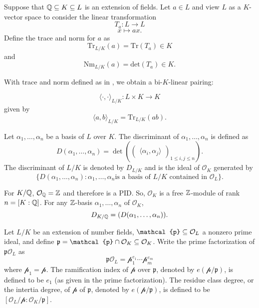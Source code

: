 
\begin{definition}
    Suppose that $\mathbb{Q} \subseteq K \subseteq L$ is an extension of fields. Let $a \in L$ and view $L$ as a $K$-vector space to consider the linear transformation
        \[T_a: L \to L\]
        \[x\mapsto ax. \]
    Define the trace and norm for $a$ as
        \[\textrm{Tr}_{L/K}(a) = \textrm{Tr}(T_a) \in K\]
    and
        \[\textrm{Nm}_{L/K}(a) = \textrm{det}(T_a) \in K.\]
\end{definition}

With trace and norm defined as in , we obtain a bi-$K$-linear pairing:

    \[\langle \cdot ,\cdot \rangle_{L/K}: L \times K \to K\]
given by
    \[\langle a, b\rangle_{L/K} = \textrm{Tr}_{L/K}(ab).\]
\begin{definition}
    Let $\alpha_1, \ldots, \alpha_n$ be a basis of $L$ over $K$. The discriminant of $\alpha_1, \ldots, \alpha_n$ is defined as
        \[D(\alpha_1, \ldots, \alpha_n) = \det\left(\begin{pmatrix}
            \langle \alpha_i, \alpha_j\rangle
        \end{pmatrix}_{1\leq i,j\leq n}\right).\]
    The discriminant of $L/K$ is denoted by $D_{L/K}$ and is the ideal of $\mathcal{O}_{K}$ generated by
        \[\{D(\alpha_1,\ldots, \alpha_n): \alpha_1, \ldots, \alpha_n \textrm{is a basis of $L/K$ contained in $\mathcal{O}_{L}$}\}.\]
\end{definition}


For $K/\mathbb{Q}$, $\mathcal{O}_{\mathbb{Q}} = \mathbb{Z}$ and therefore is a PID. So, $\mathcal{O}_{K}$ is a free $\mathbb{Z}$-module of rank $n = [K:\mathbb{Q}]$. For any $\mathbb{Z}$-basis $\alpha_1, \ldots, \alpha_n$ of $\mathcal{O}_{K}$,
    \[D_{K/\mathbb{Q}} = (D(\alpha_1, \ldots, \alpha_n)).\]

\begin{definition}
    Let $L/K$ be an extension of number fields, $\mathcal{p} \sq \mathcal{O}_{L}$ a nonzero prime ideal, and define $\mathfrak{p} = \mathcal{p}\cap \mathcal{O}_{K} \sq \mathcal{O}_{K}$. Write the prime factorization of $\mathfrak{p}\mathcal{O}_{L}$ as
    \[\mathfrak{p}\mathcal{O}_{L} = \mathcal{p}_1^{e_1}\cdots \mathcal{p}_m^{e_m}\]
    where $\mathcal{p}_1 = \mathcal{p}$. The ramification index of $\mathcal{p}$ over $\mathfrak{p}$, denoted by $e(\mathcal{p}/\mathfrak{p})$, is defined to be $e_1$ (as given in the prime factorization). The residue class degree, or the intertia degree, of $\mathcal{p}$ of $\mathfrak{p}$, denoted by $e(\mathcal{p}/\mathfrak{p})$, is defined to be $[\mathcal{O}_{L}/\mathcal{p}: \mathcal{O}_{K}/\mathfrak{p}]$.
\end{definition}

